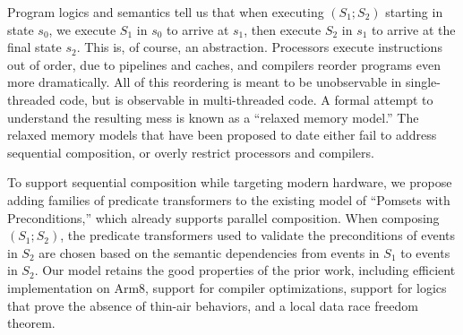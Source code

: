 
Program logics and semantics tell us that when executing $(S_1; S_2)$ starting in state $s_0$,
we execute $S_1$ in $s_0$ to arrive at $s_1$, then execute $S_2$ in $s_1$ to
arrive at the final state $s_2$.  This is, of course, an abstraction.  Processors
execute instructions out of order, due to pipelines and caches, and compilers
reorder programs even more dramatically.  All of this reordering is meant to
be unobservable in single-threaded code, but is observable in multi-threaded code.
A formal attempt to understand the resulting mess is known
as a ``relaxed memory model.''  The relaxed memory models that have been
proposed to date either fail to address sequential composition, or overly
restrict processors and compilers.

To support sequential composition while targeting modern hardware, we propose adding families of predicate
transformers to the existing model of ``Pomsets with Preconditions,'' which
already supports parallel composition.  When composing $(S_1;S_2)$, the predicate
transformers used to validate the preconditions of events in $S_2$ are chosen
based on the semantic dependencies from events in $S_1$ to events in $S_2$.  Our model
retains the good properties of the prior work, including efficient
implementation on Arm8, support for compiler optimizations, support for
logics that prove the absence of thin-air behaviors, and a local data race
freedom theorem.
